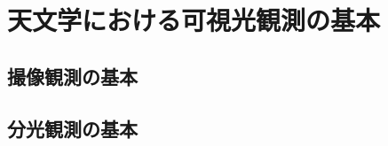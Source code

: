 \chapter{天文学における可視光観測の基本} %
\label{chap:fandamentals_of_observations}

\section{撮像観測の基本} %
\label{sect:photo_obs}

\section{分光観測の基本} %
\label{sect:spec_obs}